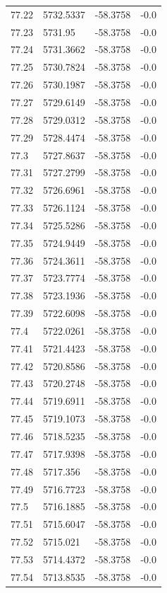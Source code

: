 \begin{table}[H]
\begin{tabular}{llll}
77.22 & 5732.5337 & -58.3758 & -0.0 \\
77.23 & 5731.95 & -58.3758 & -0.0 \\
77.24 & 5731.3662 & -58.3758 & -0.0 \\
77.25 & 5730.7824 & -58.3758 & -0.0 \\
77.26 & 5730.1987 & -58.3758 & -0.0 \\
77.27 & 5729.6149 & -58.3758 & -0.0 \\
77.28 & 5729.0312 & -58.3758 & -0.0 \\
77.29 & 5728.4474 & -58.3758 & -0.0 \\
77.3 & 5727.8637 & -58.3758 & -0.0 \\
77.31 & 5727.2799 & -58.3758 & -0.0 \\
77.32 & 5726.6961 & -58.3758 & -0.0 \\
77.33 & 5726.1124 & -58.3758 & -0.0 \\
77.34 & 5725.5286 & -58.3758 & -0.0 \\
77.35 & 5724.9449 & -58.3758 & -0.0 \\
77.36 & 5724.3611 & -58.3758 & -0.0 \\
77.37 & 5723.7774 & -58.3758 & -0.0 \\
77.38 & 5723.1936 & -58.3758 & -0.0 \\
77.39 & 5722.6098 & -58.3758 & -0.0 \\
77.4 & 5722.0261 & -58.3758 & -0.0 \\
77.41 & 5721.4423 & -58.3758 & -0.0 \\
77.42 & 5720.8586 & -58.3758 & -0.0 \\
77.43 & 5720.2748 & -58.3758 & -0.0 \\
77.44 & 5719.6911 & -58.3758 & -0.0 \\
77.45 & 5719.1073 & -58.3758 & -0.0 \\
77.46 & 5718.5235 & -58.3758 & -0.0 \\
77.47 & 5717.9398 & -58.3758 & -0.0 \\
77.48 & 5717.356 & -58.3758 & -0.0 \\
77.49 & 5716.7723 & -58.3758 & -0.0 \\
77.5 & 5716.1885 & -58.3758 & -0.0 \\
77.51 & 5715.6047 & -58.3758 & -0.0 \\
77.52 & 5715.021 & -58.3758 & -0.0 \\
77.53 & 5714.4372 & -58.3758 & -0.0 \\
77.54 & 5713.8535 & -58.3758 & -0.0 \\

\end{tabular}
\end{table}
